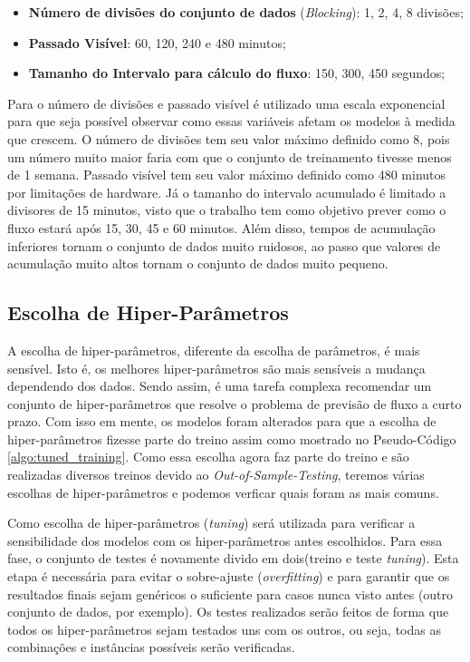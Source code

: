\begin{itemize}
    \item \textbf{Número de divisões do conjunto de dados} (\textit{Blocking}): 1, 2, 4, 8 divisões;
    \item \textbf{Passado Visível}: 60, 120, 240 e 480 minutos;
    \item \textbf{Tamanho do Intervalo para cálculo do fluxo}: 150, 300, 450 segundos;
\end{itemize}

Para o número de divisões e passado visível é utilizado uma escala exponencial para que seja possível observar como essas variáveis afetam os modelos à medida que crescem. O número de divisões tem seu valor máximo definido como 8, pois um número muito maior faria com que o conjunto de treinamento tivesse menos de 1 semana. Passado visível tem seu valor máximo definido como 480 minutos por limitações de hardware. Já o tamanho do intervalo acumulado é limitado a divisores de 15 minutos, visto que o trabalho tem como objetivo prever como o fluxo estará após 15, 30, 45 e 60 minutos. Além disso, tempos de acumulação inferiores tornam o conjunto de dados muito ruidosos, ao passo que valores de acumulação muito altos tornam o conjunto de dados muito pequeno.

\subsection{Escolha de Hiper-Parâmetros}

A escolha de hiper-parâmetros, diferente da escolha de parâmetros, é mais sensível. Isto é, os melhores hiper-parâmetros são mais sensíveis a mudança dependendo dos dados. Sendo assim, é uma tarefa complexa recomendar um conjunto de hiper-parâmetros que resolve o problema de previsão de fluxo a curto prazo. Com isso em mente, os modelos foram alterados para que a escolha de hiper-parâmetros fizesse parte do treino assim como mostrado no Pseudo-Código \ref{algo:tuned_training}. Como essa escolha agora faz parte do treino e são realizadas diversos treinos devido ao \textit{Out-of-Sample-Testing}, teremos várias escolhas de hiper-parâmetros e podemos verficar quais foram as mais comuns.

Como escolha de hiper-parâmetros (\textit{tuning}) será utilizada para verificar a sensibilidade dos modelos com os hiper-parâmetros antes escolhidos. Para essa fase, o conjunto de testes é novamente divido em dois(treino e teste \textit{tuning}). Esta etapa é necessária para evitar o sobre-ajuste (\textit{overfitting}) e para garantir que os resultados finais sejam genéricos o suficiente para casos nunca visto antes (outro conjunto de dados, por exemplo). Os testes realizados serão feitos de forma que todos os hiper-parâmetros sejam testados uns com os outros, ou seja, todas as combinações e instâncias possíveis serão verificadas. 


